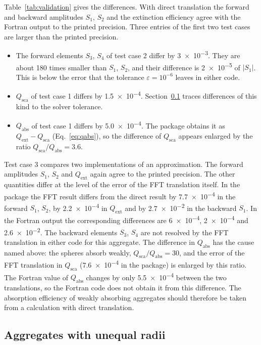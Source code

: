\documentclass[11pt,a4paper]{article}
\begin{document}
Table~\ref{tab:validation} gives the differences.
With direct translation the forward and backward amplitudes $S_1$, $S_2$ and the extinction efficiency agree with the Fortran output to the printed precision.
Three entries of the first two test cases are larger than the printed precision.
\begin{itemize}[nosep]
  \item The forward elements $S_3$, $S_4$ of test case 2 differ by \num{3e-3}.
  They are about 180 times smaller than $S_1$, $S_2$, and their difference is \num{2e-5} of $|S_1|$.
  This is below the error that the tolerance $\varepsilon = 10^{-6}$ leaves in either code.
  \item $Q_\mathrm{sca}$ of test case 1 differs by \num{1.5e-4}.
  Section~\ref{sec:validation-unequal} traces differences of this kind to the solver tolerance.
  \item $Q_\mathrm{abs}$ of test case 1 differs by \num{5.0e-4}.
  The package obtains it as $Q_\mathrm{ext} - Q_\mathrm{sca}$ (Eq.~\eqref{eq:qabs}), so the difference of $Q_\mathrm{sca}$ appears enlarged by the ratio $Q_\mathrm{sca}/Q_\mathrm{abs} = 3.6$.
\end{itemize}

Test case 3 compares two implementations of an approximation.
The forward amplitudes $S_1$, $S_2$ and $Q_\mathrm{ext}$ again agree to the printed precision.
The other quantities differ at the level of the error of the FFT translation itself.
In the package the FFT result differs from the direct result by \num{7.7e-4} in the forward $S_1$, $S_2$, by \num{2.2e-4} in $Q_\mathrm{ext}$ and by \num{2.7e-2} in the backward $S_1$.
In the Fortran output the corresponding differences are \num{6e-4}, \num{2e-4} and \num{2.6e-2}.
The backward elements $S_3$, $S_4$ are not resolved by the FFT translation in either code for this aggregate.
The difference in $Q_\mathrm{abs}$ has the cause named above: the spheres absorb weakly, $Q_\mathrm{sca}/Q_\mathrm{abs} = 30$, and the error of the FFT translation in $Q_\mathrm{sca}$ (\num{7.6e-4} in the package) is enlarged by this ratio.
The Fortran value of $Q_\mathrm{abs}$ changes by only \num{5.5e-4} between the two translations, so the Fortran code does not obtain it from this difference.
The absorption efficiency of weakly absorbing aggregates should therefore be taken from a calculation with direct translation.

\subsection{Aggregates with unequal radii}
\label{sec:validation-unequal}
\end{document}
